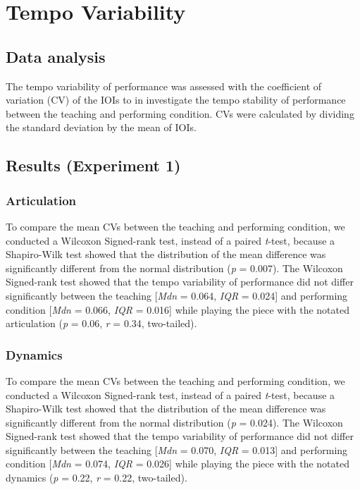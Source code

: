 \documentclass[
  man,floatsintext]{apa6}
\begin{document}
\clearpage

\hypertarget{tempo-variability}{%
\section{Tempo Variability}\label{tempo-variability}}

\hypertarget{data-analysis-2}{%
\subsection{Data analysis}\label{data-analysis-2}}

The tempo variability of performance was assessed with the coefficient of variation (CV) of the IOIs to in investigate the tempo stability of performance between the teaching and performing condition. CVs were calculated by dividing the standard deviation by the mean of IOIs.

\hypertarget{results-experiment-1}{%
\subsection{Results (Experiment 1)}\label{results-experiment-1}}

\hypertarget{articulation-2}{%
\subsubsection{Articulation}\label{articulation-2}}

To compare the mean CVs between the teaching and performing condition, we conducted a Wilcoxon Signed-rank test, instead of a paired \emph{t}-test, because a Shapiro-Wilk test showed that the distribution of the mean difference was significantly different from the normal distribution (\emph{p} = 0.007). The Wilcoxon Signed-rank test showed that the tempo variability of performance did not differ significantly between the teaching {[}\emph{Mdn} = 0.064, \emph{IQR} = 0.024{]} and performing condition {[}\emph{Mdn} = 0.066, \emph{IQR} = 0.016{]} while playing the piece with the notated articulation (\emph{p} = 0.06, \emph{r} = 0.34, two-tailed).

\hypertarget{dynamics-2}{%
\subsubsection{Dynamics}\label{dynamics-2}}

To compare the mean CVs between the teaching and performing condition, we conducted a Wilcoxon Signed-rank test, instead of a paired \emph{t}-test, because a Shapiro-Wilk test showed that the distribution of the mean difference was significantly different from the normal distribution (\emph{p} = 0.024). The Wilcoxon Signed-rank test showed that the tempo variability of performance did not differ significantly between the teaching {[}\emph{Mdn} = 0.070, \emph{IQR} = 0.013{]} and performing condition {[}\emph{Mdn} = 0.074, \emph{IQR} = 0.026{]} while playing the piece with the notated dynamics (\emph{p} = 0.22, \emph{r} = 0.22, two-tailed).
\end{document}
